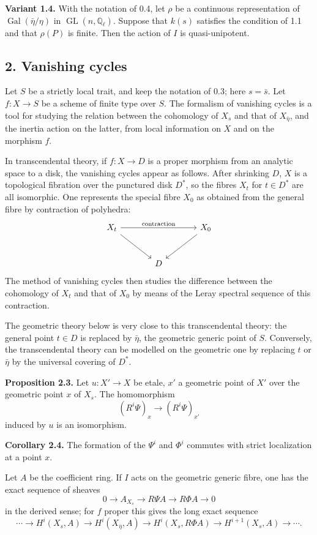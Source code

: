 \documentclass[11pt]{article}
\providecommand{\Gal}{\operatorname{Gal}}
\providecommand{\GL}{\operatorname{GL}}
\providecommand{\Ql}{\mathbb Q_\ell}
\begin{document}
\textbf{Variant 1.4.} With the notation of 0.4, let $\rho$ be a continuous representation of $\Gal(\bar\eta/\eta)$ in $\GL(n,\Ql)$. Suppose that $k(s)$ satisfies the condition of 1.1 and that $\rho(P)$ is finite. Then the action of $I$ is quasi-unipotent.

\subsection*{2. Vanishing cycles}
Let $S$ be a strictly local trait, and keep the notation of 0.3; here $s=\bar s$. Let $f:X\to S$ be a scheme of finite type over $S$. The formalism of vanishing cycles is a tool for studying the relation between the cohomology of $X_s$ and that of $X_{\bar\eta}$, and the inertia action on the latter, from local information on $X$ and on the morphism $f$.

In transcendental theory, if $f:X\to D$ is a proper morphism from an analytic space to a disk, the vanishing cycles appear as follows. After shrinking $D$, $X$ is a topological fibration over the punctured disk $D^*$, so the fibres $X_t$ for $t\in D^*$ are all isomorphic. One represents the special fibre $X_0$ as obtained from the general fibre by contraction of polyhedra:
\[
\begin{tikzcd}[column sep=large,row sep=large]
X_t \arrow[rr,"\text{contraction}"] \arrow[dr] && X_0 \arrow[dl]\\
& D &
\end{tikzcd}
\]
The method of vanishing cycles then studies the difference between the cohomology of $X_t$ and that of $X_0$ by means of the Leray spectral sequence of this contraction.

The geometric theory below is very close to this transcendental theory: the general point $t\in D$ is replaced by $\bar\eta$, the geometric generic point of $S$. Conversely, the transcendental theory can be modelled on the geometric one by replacing $t$ or $\bar\eta$ by the universal covering of $D^*$.

\textbf{Proposition 2.3.} Let $u:X'\to X$ be etale, $x'$ a geometric point of $X'$ over the geometric point $x$ of $X_s$. The homomorphism
\[
 (R^i\Psi)_x\longrightarrow (R^i\Psi)_{x'}
\]
induced by $u$ is an isomorphism.

\textbf{Corollary 2.4.} The formation of the $\Psi^i$ and $\Phi^i$ commutes with strict localization at a point $x$.

Let $A$ be the coefficient ring. If $I$ acts on the geometric generic fibre, one has the exact sequence of sheaves
\[
0\to A_{X_s}\to R\Psi A\to R\Phi A\to 0
\]
in the derived sense; for $f$ proper this gives the long exact sequence
\[
\cdots\to H^i(X_s,A)\to H^i(X_{\bar\eta},A)\to H^i(X_s,R\Phi A)\to H^{i+1}(X_s,A)\to\cdots .
\]
\end{document}
